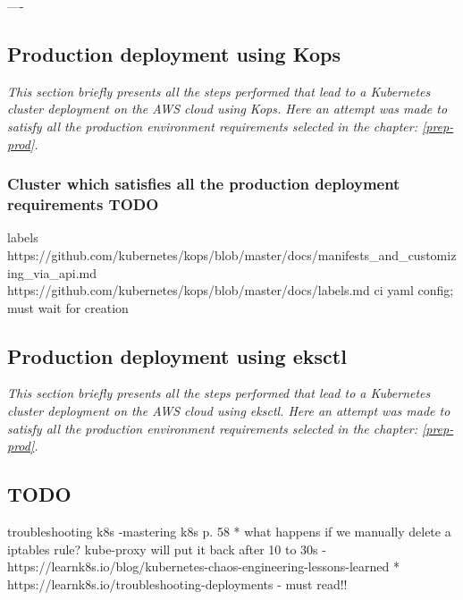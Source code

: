 ----



\subsection{Production deployment using Kops}
\textit{This section briefly presents all the steps performed that lead to a Kubernetes cluster deployment on the AWS cloud using Kops. Here an attempt was made to satisfy all the production environment requirements selected in the chapter: \ref{prep-prod}.}
\\

\subsubsection{Cluster which satisfies all the production deployment requirements TODO}


labels https://github.com/kubernetes/kops/blob/master/docs/manifests_and_customizing_via_api.md https://github.com/kubernetes/kops/blob/master/docs/labels.md
ci yaml config; must wait for creation

\subsection{Production deployment using eksctl}
\textit{This section briefly presents all the steps performed that lead to a Kubernetes cluster deployment on the AWS cloud using eksctl. Here an attempt was made to satisfy all the production environment requirements selected in the chapter: \ref{prep-prod}.}
\\

\subsection{TODO}

troubleshooting k8s -mastering k8s p. 58
* what happens if we manually delete a iptables rule? kube-proxy will put it back after 10 to 30s - https://learnk8s.io/blog/kubernetes-chaos-engineering-lessons-learned
* https://learnk8s.io/troubleshooting-deployments - must read!!

